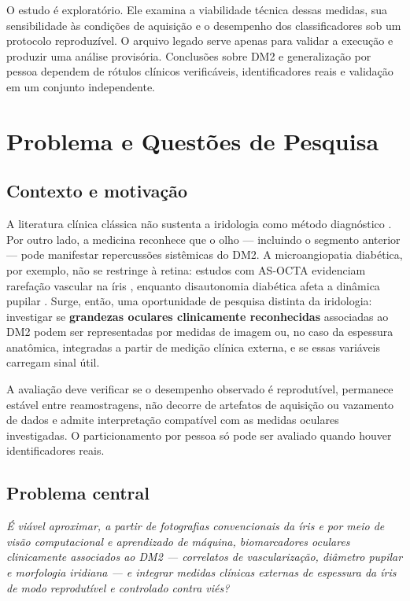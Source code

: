 \documentclass[12pt,a4paper]{article}
\begin{document}
O estudo é exploratório. Ele examina a viabilidade técnica dessas medidas, sua sensibilidade às
condições de aquisição e o desempenho dos classificadores sob um protocolo reproduzível. O arquivo
legado serve apenas para validar a execução e produzir uma análise provisória. Conclusões sobre DM2 e
generalização por pessoa dependem de rótulos clínicos verificáveis, identificadores reais e validação
em um conjunto independente.

\section{Problema e Questões de Pesquisa}

\subsection{Contexto e motivação}
A literatura clínica clássica não sustenta a iridologia como método diagnóstico
\citep{Simon1979JAMA,Ernst2000ArchOphthalmol}. Por outro lado, a medicina reconhece que o olho ---
incluindo o segmento anterior --- pode manifestar repercussões sistêmicas do DM2. A microangiopatia
diabética, por exemplo, não se restringe à retina: estudos com AS-OCTA evidenciam rarefação vascular
na íris \citep{Zhou2025SciRep}, enquanto disautonomia diabética afeta a dinâmica pupilar
\citep{Thakar2025Eye}. Surge, então, uma oportunidade de pesquisa distinta da iridologia: investigar
se \textbf{grandezas oculares clinicamente reconhecidas} associadas ao DM2 podem ser representadas por
medidas de imagem ou, no caso da espessura anatômica, integradas a partir de medição clínica externa,
e se essas variáveis carregam sinal útil.

A avaliação deve verificar se o desempenho observado é reprodutível, permanece estável entre
reamostragens, não decorre de artefatos de aquisição ou vazamento de dados e admite interpretação
compatível com as medidas oculares investigadas. O particionamento por pessoa só pode ser avaliado
quando houver identificadores reais.

\subsection{Problema central}
\emph{É viável aproximar, a partir de fotografias convencionais da íris e por meio de visão
computacional e aprendizado de máquina, biomarcadores oculares clinicamente associados ao DM2 ---
correlatos de vascularização, diâmetro pupilar e morfologia iridiana --- e integrar medidas clínicas
externas de espessura da íris de modo reprodutível e controlado contra viés?}
\end{document}
